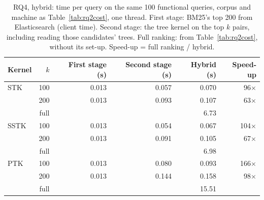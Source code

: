 \begin{table}[!htbp]
\centering
\caption{RQ4, hybrid: time per query on the same 100 functional queries, corpus and machine as Table~\ref{tab:rq2cost}, one thread. First stage: BM25's top 200 from Elasticsearch (client time). Second stage: the tree kernel on the top $k$ pairs, including reading those candidates' trees. Full ranking: from Table~\ref{tab:rq2cost}, without its set-up. Speed-up = full ranking / hybrid.}
\label{tab:hybridcost}
\footnotesize
\setlength{\tabcolsep}{4pt}
\begin{tabular}{lrrrrr}
\toprule
Kernel & $k$ & First stage (s) & Second stage (s) & Hybrid (s) & Speed-up \\
\midrule
STK & 100 & 0.013 & 0.057 & 0.070 & 96$\times$ \\
 & 200 & 0.013 & 0.093 & 0.107 & 63$\times$ \\
 & full & & & 6.73 & \\
\midrule
SSTK & 100 & 0.013 & 0.054 & 0.067 & 104$\times$ \\
 & 200 & 0.013 & 0.091 & 0.105 & 67$\times$ \\
 & full & & & 6.98 & \\
\midrule
PTK & 100 & 0.013 & 0.080 & 0.093 & 166$\times$ \\
 & 200 & 0.013 & 0.144 & 0.158 & 98$\times$ \\
 & full & & & 15.51 & \\
\bottomrule
\end{tabular}
\end{table}
